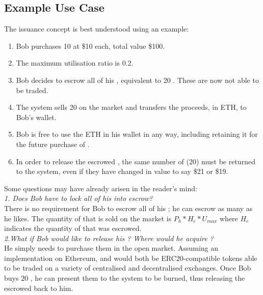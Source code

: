 \newpage

\subsection{Example Use Case}

\noindent The issuance concept is best understood using an example:
\begin{enumerate}
\item{Bob purchases 10 \HAV{} at \$10 each, total value \$100.}
\item{The maximum utilisation ratio is 0.2.}
\item{Bob decides to escrow all of his \HAV{}, equivalent to 20 \NOM{}. These \HAV{} are now not able to be traded.}
\item{The system sells 20 \NOM{} on the market and transfers the proceeds, in ETH, to Bob's wallet.}
\item{Bob is free to use the ETH in his wallet in any way, including retaining it for the future purchase of \NOM{}.}
\item{In order to release the escrowed \HAV{}, the same number of \NOM{} (20) must be returned to the system, even if they have changed in value to say \$21 or \$19.}
\end{enumerate} 

\noindent Some questions may have already arisen in the reader's mind: \\

\noindent \emph{1. Does Bob have to lock all of his \HAV{} into escrow?} \\ 

\noindent There is no requirement for Bob to escrow all of his \HAV{}; he can escrow as many as he likes. The quantity of \NOM{} that is sold on the market is $ P_h * H_e * U_{max} $ where $H_e$ indicates the quantity of \HAV{} that was escrowed. \\

\noindent \emph{2.What if Bob would like to release his \HAV{}? Where would he acquire \NOM{}?} \\ 

\noindent He simply needs to purchase them in the open market. Assuming an implementation on Ethereum, \HAV{} and \NOM{} would both be ERC20-compatible tokens able to be traded on a variety of centralised and decentralised exchanges. Once Bob buys $20$ \NOM{}, he can present them to the system to be burned, thus releasing the escrowed \HAV{} back to him. \\ 

